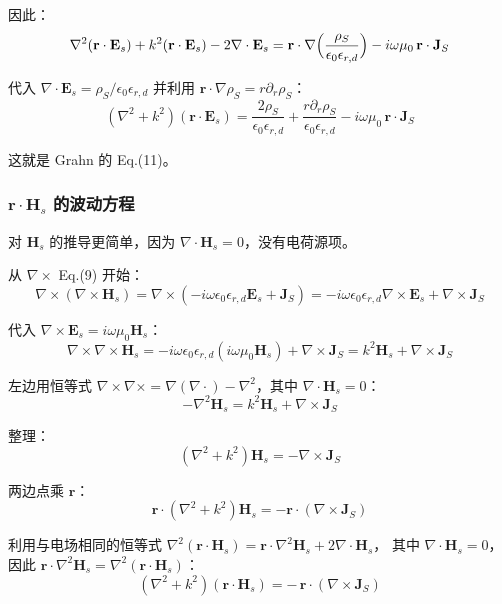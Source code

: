 因此：
$$
\nabla^2(\mathbf{r}\cdot\mathbf{E}_s) + k^2(\mathbf{r}\cdot\mathbf{E}_s) - 2\nabla\cdot\mathbf{E}_s
= \mathbf{r}\cdot\nabla\Bigl(\frac{\rho_S}{\epsilon_0\epsilon_{r,d}}\Bigr) - i\omega\mu_0\,\mathbf{r}\cdot\mathbf{J}_S
$$

代入 $\nabla\cdot\mathbf{E}_s = \rho_S/\epsilon_0\epsilon_{r,d}$ 并利用 $\mathbf{r}\cdot\nabla\rho_S = r\partial_r\rho_S$：
\begin{equation}
  (\nabla^2 + k^2)(\mathbf{r}\cdot\mathbf{E}_s) = \frac{2\rho_S}{\epsilon_0\epsilon_{r,d}}
    + \frac{r\partial_r\rho_S}{\epsilon_0\epsilon_{r,d}} - i\omega\mu_0\,\mathbf{r}\cdot\mathbf{J}_S
  \label{eq:scalar_eq_rE}
\end{equation}

这就是 Grahn 的 Eq.(11)。

\subsubsection{$\mathbf{r}\cdot\mathbf{H}_s$ 的波动方程}

对 $\mathbf{H}_s$ 的推导更简单，因为 $\nabla\cdot\mathbf{H}_s=0$，没有电荷源项。

从 $\nabla\times$ Eq.(9) 开始：
$$
\nabla\times(\nabla\times\mathbf{H}_s) = \nabla\times(-i\omega\epsilon_0\epsilon_{r,d}\mathbf{E}_s + \mathbf{J}_S)
= -i\omega\epsilon_0\epsilon_{r,d}\nabla\times\mathbf{E}_s + \nabla\times\mathbf{J}_S
$$

代入 $\nabla\times\mathbf{E}_s = i\omega\mu_0\mathbf{H}_s$：
$$
\nabla\times\nabla\times\mathbf{H}_s = -i\omega\epsilon_0\epsilon_{r,d}(i\omega\mu_0\mathbf{H}_s) + \nabla\times\mathbf{J}_S
= k^2\mathbf{H}_s + \nabla\times\mathbf{J}_S
$$

左边用恒等式 $\nabla\times\nabla\times = \nabla(\nabla\cdot) - \nabla^2$，其中 $\nabla\cdot\mathbf{H}_s=0$：
$$
-\nabla^2\mathbf{H}_s = k^2\mathbf{H}_s + \nabla\times\mathbf{J}_S
$$

整理：
\begin{equation}
  (\nabla^2 + k^2)\mathbf{H}_s = -\nabla\times\mathbf{J}_S
  \label{eq:helmholtz_H}
\end{equation}

两边点乘 $\mathbf{r}$：
$$
\mathbf{r}\cdot(\nabla^2 + k^2)\mathbf{H}_s = -\mathbf{r}\cdot(\nabla\times\mathbf{J}_S)
$$

利用与电场相同的恒等式 $\nabla^2(\mathbf{r}\cdot\mathbf{H}_s) = \mathbf{r}\cdot\nabla^2\mathbf{H}_s + 2\nabla\cdot\mathbf{H}_s$，
其中 $\nabla\cdot\mathbf{H}_s=0$，因此 $\mathbf{r}\cdot\nabla^2\mathbf{H}_s = \nabla^2(\mathbf{r}\cdot\mathbf{H}_s)$：
\begin{equation}
  (\nabla^2 + k^2)(\mathbf{r}\cdot\mathbf{H}_s) = -\,\mathbf{r}\cdot(\nabla\times\mathbf{J}_S)
  \label{eq:scalar_eq_rH}
\end{equation}


